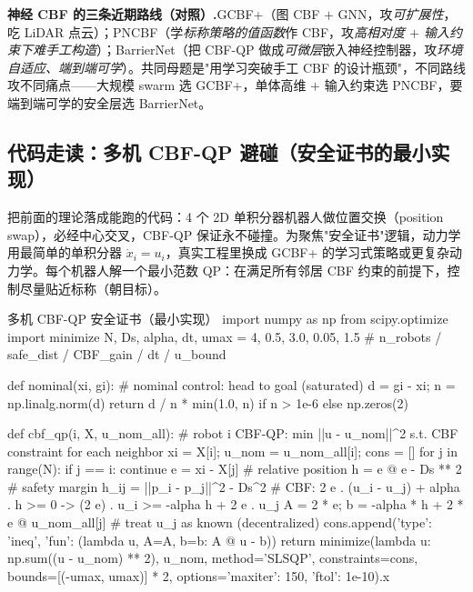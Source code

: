 \begin{note}
\textbf{神经 CBF 的三条近期路线（对照）.}\;GCBF+\cite{zhang2025gcbfplus}（图 CBF $+$ GNN，攻\emph{可扩展性}，吃 LiDAR 点云）；PNCBF\cite{so2024pncbf}（学\emph{标称策略的值函数}作 CBF，攻\emph{高相对度 $+$ 输入约束下难手工构造}）；BarrierNet\cite{xiao2023barriernet}（把 CBF-QP 做成\emph{可微层}嵌入神经控制器，攻\emph{环境自适应、端到端可学}）。共同母题是"用学习突破手工 CBF 的设计瓶颈"，不同路线攻不同痛点——大规模 swarm 选 GCBF+，单体高维 $+$ 输入约束选 PNCBF，要端到端可学的安全层选 BarrierNet。
\end{note}

\subsection{代码走读：多机 CBF-QP 避碰（安全证书的最小实现）}
\label{sec:sm-cbf-code}

把前面的理论落成能跑的代码：4 个 2D 单积分器机器人做位置交换（position swap），必经中心交叉，CBF-QP 保证永不碰撞。为聚焦"安全证书"逻辑，动力学用最简单的单积分器 $\dot x_i=u_i$，真实工程里换成 GCBF+ 的学习式策略或更复杂动力学。每个机器人解一个最小范数 QP：在满足所有邻居 CBF 约束的前提下，控制尽量贴近标称（朝目标）。

\begin{codebox}[Python]{多机 CBF-QP 安全证书（最小实现）}
import numpy as np
from scipy.optimize import minimize
N, Ds, alpha, dt, umax = 4, 0.5, 3.0, 0.05, 1.5    # n_robots / safe_dist / CBF_gain / dt / u_bound

def nominal(xi, gi):                                # nominal control: head to goal (saturated)
    d = gi - xi; n = np.linalg.norm(d)
    return d / n * min(1.0, n) if n > 1e-6 else np.zeros(2)

def cbf_qp(i, X, u_nom_all):
    # robot i CBF-QP: min ||u - u_nom||^2 s.t. CBF constraint for each neighbor
    xi = X[i]; u_nom = u_nom_all[i]; cons = []
    for j in range(N):
        if j == i:
            continue
        e = xi - X[j]                               # relative position
        h = e @ e - Ds ** 2                         # safety margin h_ij = ||p_i - p_j||^2 - Ds^2
        # CBF: 2 e . (u_i - u_j) + alpha . h >= 0  ->  (2 e) . u_i >= -alpha h + 2 e . u_j
        A = 2 * e; b = -alpha * h + 2 * e @ u_nom_all[j]   # treat u_j as known (decentralized)
        cons.append({'type': 'ineq', 'fun': (lambda u, A=A, b=b: A @ u - b)})
    return minimize(lambda u: np.sum((u - u_nom) ** 2), u_nom, method='SLSQP',
                    constraints=cons, bounds=[(-umax, umax)] * 2,
                    options={'maxiter': 150, 'ftol': 1e-10}).x
\end{codebox}

